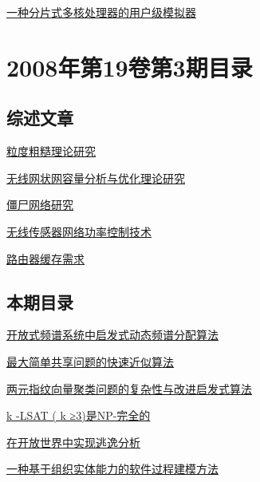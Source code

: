 \documentclass[a4paper]{article}
\begin{document}
\href{http://www.jos.org.cn/ch/reader/download_pdf.aspx?file_no=20080423&year_id=2008&quarter_id=4&falg=1}{一种分片式多核处理器的用户级模拟器}


\section{\textbf{2008年第19卷第3期目录}}
\subsection{综述文章}
\href{http://www.jos.org.cn/ch/reader/download_pdf.aspx?file_no=20080309&year_id=2008&quarter_id=3&falg=1}{粒度粗糙理论研究}

\href{http://www.jos.org.cn/ch/reader/download_pdf.aspx?file_no=20080319&year_id=2008&quarter_id=3&falg=1}{无线网状网容量分析与优化理论研究}

\href{http://www.jos.org.cn/ch/reader/download_pdf.aspx?file_no=20080320&year_id=2008&quarter_id=3&falg=1}{僵尸网络研究}

\href{http://www.jos.org.cn/ch/reader/download_pdf.aspx?file_no=20080321&year_id=2008&quarter_id=3&falg=1}{无线传感器网络功率控制技术}

\href{http://www.jos.org.cn/ch/reader/download_pdf.aspx?file_no=20080322&year_id=2008&quarter_id=3&falg=1}{路由器缓存需求}

\subsection{本期目录}
\href{http://www.jos.org.cn/ch/reader/download_pdf.aspx?file_no=20080301&year_id=2008&quarter_id=3&falg=1}{开放式频谱系统中启发式动态频谱分配算法}

\href{http://www.jos.org.cn/ch/reader/download_pdf.aspx?file_no=20080302&year_id=2008&quarter_id=3&falg=1}{最大简单共享问题的快速近似算法}

\href{http://www.jos.org.cn/ch/reader/download_pdf.aspx?file_no=20080303&year_id=2008&quarter_id=3&falg=1}{两元指纹向量聚类问题的复杂性与改进启发式算法}

\href{http://www.jos.org.cn/ch/reader/download_pdf.aspx?file_no=20080304&year_id=2008&quarter_id=3&falg=1}{k -LSAT ( k ≥3)是NP-完全的}

\href{http://www.jos.org.cn/ch/reader/download_pdf.aspx?file_no=20080305&year_id=2008&quarter_id=3&falg=1}{在开放世界中实现逃逸分析}

\href{http://www.jos.org.cn/ch/reader/download_pdf.aspx?file_no=20080306&year_id=2008&quarter_id=3&falg=1}{一种基于组织实体能力的软件过程建模方法}
\end{document}
